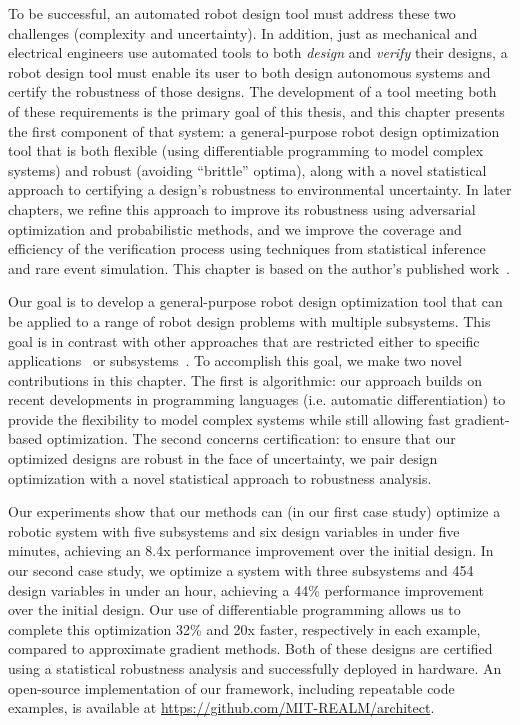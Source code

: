 To be successful, an automated robot design tool must address these two challenges (complexity and uncertainty). In addition, just as mechanical and electrical engineers use automated tools to both \textit{design} and \textit{verify} their designs, a robot design tool must enable its user to both design autonomous systems and certify the robustness of those designs. The development of a tool meeting both of these requirements is the primary goal of this thesis, and this chapter presents the first component of that system: a general-purpose robot design optimization tool that is both flexible (using differentiable programming to model complex systems) and robust (avoiding ``brittle'' optima), along with a novel statistical approach to certifying a design's robustness to environmental uncertainty. In later chapters, we refine this approach to improve its robustness using adversarial optimization and probabilistic methods, and we improve the coverage and efficiency of the verification process using techniques from statistical inference and rare event simulation. This chapter is based on the author's published work~\cite{dawsonCertifiableRobotDesign2022}.

Our goal is to develop a general-purpose robot design optimization tool that can be applied to a range of robot design problems with multiple subsystems. This goal is in contrast with other approaches that are restricted either to specific applications~\cite{Schulz_robogami,du2016computational,soft_robot_optimization_review,du2021underwater,ma2021diffaqua,zhang_mdo_analysis} or subsystems~\cite{xu_uav_controllers}. To accomplish this goal, we make two novel contributions in this chapter. The first is algorithmic: our approach builds on recent developments in programming languages (i.e. automatic differentiation) to provide the flexibility to model complex systems while still allowing fast gradient-based optimization. The second concerns certification: to ensure that our optimized designs are robust in the face of uncertainty, we pair design optimization with a novel statistical approach to robustness analysis.

Our experiments show that our methods can (in our first case study) optimize a robotic system with five subsystems and six design variables in under five minutes, achieving an 8.4x performance improvement over the initial design. In our second case study, we optimize a system with three subsystems and 454 design variables in under an hour, achieving a 44\% performance improvement over the initial design. Our use of differentiable programming allows us to complete this optimization 32\% and 20x faster, respectively in each example, compared to approximate gradient methods. Both of these designs are certified using a statistical robustness analysis and successfully deployed in hardware. An open-source implementation of our framework, including repeatable code examples, is available at \url{https://github.com/MIT-REALM/architect}.

